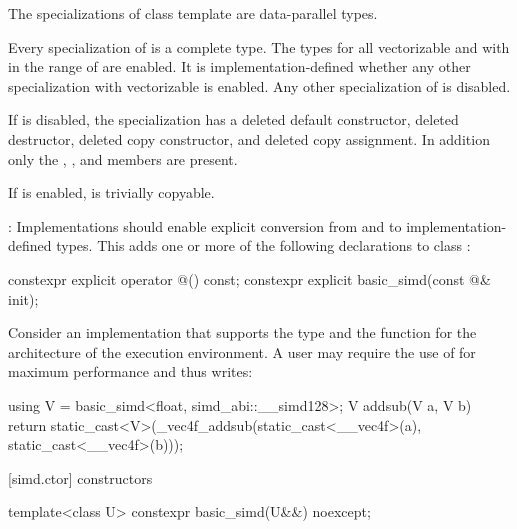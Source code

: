 \pnum
The specializations of class template  are data-parallel types.

\pnum
Every specialization of  is a complete type.
The types  for all vectorizable
 and with  in the range of  are enabled.
It is implementation-defined whether any other  specialization
with vectorizable  is enabled.
Any other specialization of  is disabled.

If  is disabled, the specialization has a
deleted default constructor, deleted destructor, deleted copy constructor, and
deleted copy assignment.
In addition only the , , and
 members are present.

If  is enabled,  is
trivially copyable.

\pnum\recommended:
Implementations should enable explicit conversion from and to
implementation-defined types. This adds one or more of the following
declarations to class :

\begin{codeblock}
constexpr explicit operator @\impdef@() const;
constexpr explicit basic_simd(const @\impdef@& init);
\end{codeblock}

\begin{example}
  Consider an implementation that supports the type  and the function  for the architecture of the execution environment.
  A user may require the use of  for maximum performance and thus writes:
  \begin{codeblock}
    using V = basic_simd<float, simd_abi::__simd128>;
    V addsub(V a, V b) {
      return static_cast<V>(_vec4f_addsub(static_cast<__vec4f>(a), static_cast<__vec4f>(b)));
    }
  \end{codeblock}
\end{example}


[simd.ctor]{ constructors}

\begin{itemdecl}
template<class U> constexpr basic_simd(U&&) noexcept;
\end{itemdecl}

